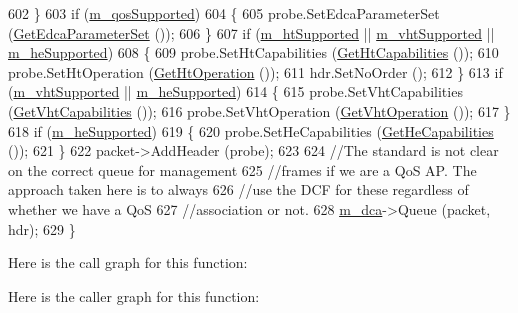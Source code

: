 \begin{DoxyCode}
602     \}
603   \textcolor{keywordflow}{if} (\hyperlink{classns3_1_1RegularWifiMac_aeecdb918687493a8efdd70304bc0cee9}{m\_qosSupported})
604     \{
605       probe.SetEdcaParameterSet (\hyperlink{classns3_1_1ApWifiMac_a6b29faae7352877a1aa97a2146725ff5}{GetEdcaParameterSet} ());
606     \}
607   \textcolor{keywordflow}{if} (\hyperlink{classns3_1_1RegularWifiMac_a8950c44b8cf2ad1f9274821cf88adc7b}{m\_htSupported} || \hyperlink{classns3_1_1RegularWifiMac_a151f330fdeb3f83f9ec7cf07537f0e86}{m\_vhtSupported} || 
      \hyperlink{classns3_1_1RegularWifiMac_a9458143c722fa0b6e5d223d41585842a}{m\_heSupported})
608     \{
609       probe.SetHtCapabilities (\hyperlink{classns3_1_1RegularWifiMac_ae2b0a52735a938a0f1ca233397ae2185}{GetHtCapabilities} ());
610       probe.SetHtOperation (\hyperlink{classns3_1_1ApWifiMac_ae67f8b753332b379d189007ffee40733}{GetHtOperation} ());
611       hdr.SetNoOrder ();
612     \}
613   \textcolor{keywordflow}{if} (\hyperlink{classns3_1_1RegularWifiMac_a151f330fdeb3f83f9ec7cf07537f0e86}{m\_vhtSupported} || \hyperlink{classns3_1_1RegularWifiMac_a9458143c722fa0b6e5d223d41585842a}{m\_heSupported})
614     \{
615       probe.SetVhtCapabilities (\hyperlink{classns3_1_1RegularWifiMac_ade487870f5663694d30a2dd6a7e614e8}{GetVhtCapabilities} ());
616       probe.SetVhtOperation (\hyperlink{classns3_1_1ApWifiMac_afde045b9f011d312e3110bb5b9411403}{GetVhtOperation} ());
617     \}
618   \textcolor{keywordflow}{if} (\hyperlink{classns3_1_1RegularWifiMac_a9458143c722fa0b6e5d223d41585842a}{m\_heSupported})
619     \{
620       probe.SetHeCapabilities (\hyperlink{classns3_1_1RegularWifiMac_aea22761a20fdff9f6c1a9acc49d63700}{GetHeCapabilities} ());
621     \}
622   packet->AddHeader (probe);
623 
624   \textcolor{comment}{//The standard is not clear on the correct queue for management}
625   \textcolor{comment}{//frames if we are a QoS AP. The approach taken here is to always}
626   \textcolor{comment}{//use the DCF for these regardless of whether we have a QoS}
627   \textcolor{comment}{//association or not.}
628   \hyperlink{classns3_1_1RegularWifiMac_a152965c3def1a308b088b37c2c88a1a2}{m\_dca}->Queue (packet, hdr);
629 \}
\end{DoxyCode}


Here is the call graph for this function\+:




Here is the caller graph for this function\+:


